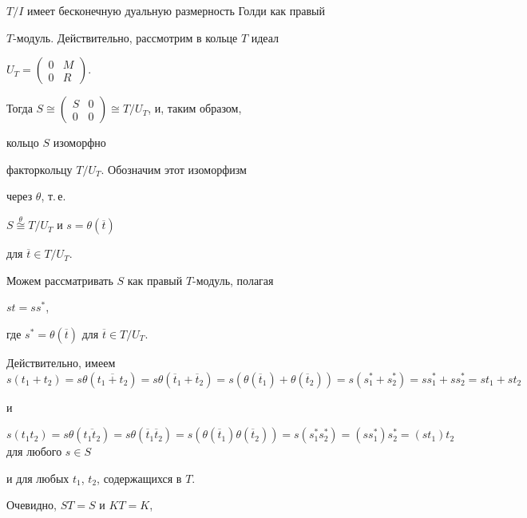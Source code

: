 \begin{exam}
 


$T/I$ имеет бесконечную дуальную размерность Голди как правый 


$T$-модуль. Действительно, рассмотрим в кольце $T$ идеал


$U_T=


\left(\begin{smallmatrix} {0} & {M} \\ {0} & {R}\end{smallmatrix}\right)$.


Тогда $S \cong 


\left(\begin{smallmatrix}


{S} & {0} \\ {0} & {0}\end{smallmatrix}\right)


\cong T/U_T$, и, таким образом,


кольцо $S$ изоморфно 


факторкольцу $T/U_T$. Обозначим этот изоморфизм


через $\theta$, т.\,е. 


$S \overset{\theta}{\cong}{} T/U_T$ и $s=\theta (\overline {t})$ 


для $\overline {t} \in T/U_T$. 


Можем рассматривать $S$ как правый $T$-модуль, полагая 


$st=s s^*$, 


где $s^*=\theta (\overline {t})$ для $\overline {t} \in T/U_T$. 


Действительно, имеем $s(t_1+t_2)=s \theta (\overline {t_1+t_2})=


s \theta (\overline {t}_1+\overline {t}_2)=


s(\theta (\overline {t}_1)+\theta (\overline {t}_2))=s(s_1^*+s_2^*)=


ss_1^*+ss_2^*=st_1+st_2$


и 


$s(t_1 t_2)=s \theta (\overline {t_1 t_2})=


s \theta (\overline {t}_1 \overline {t}_2)=


s(\theta (\overline {t}_1) \theta (\overline {t}_2))=s(s_1^* s_2^*)=


(ss_1^* )s_2^*=(st_1) t_2$ для любого $s \in S$


и для любых $t_1$, $t_2$, содержащихся в $T$.





Очевидно, $ST=S$ и $KT=K$, 



\end{exam}
